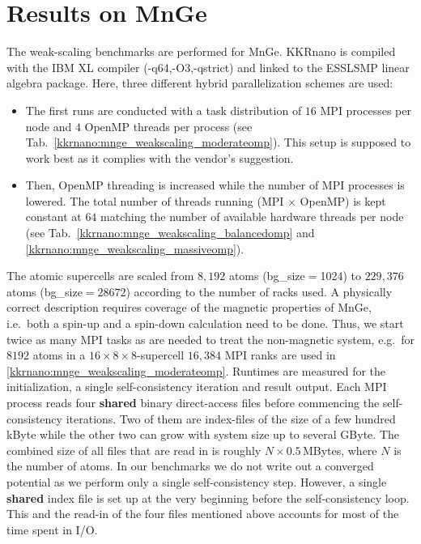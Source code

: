 \section*{Results on MnGe} 
The weak-scaling benchmarks are performed for MnGe. KKRnano is compiled
with the IBM XL compiler (-q64,-O3,-qstrict) and linked to the ESSLSMP linear algebra package.
Here, three different hybrid parallelization schemes are used:
\begin{itemize}
 \item The first runs are conducted with a task distribution of $16$ MPI processes per node 
and $4$ OpenMP threads per process (see Tab.~\ref{kkrnano:mnge_weakscaling_moderateomp}).
This setup is supposed to work best as it complies with the vendor's suggestion.
 \item Then, OpenMP threading is increased while the number of MPI processes is lowered. 
The total number of threads running (MPI $\times$ OpenMP) is kept constant at $64$ matching 
the number of available hardware threads per node 
(see Tab.~\ref{kkrnano:mnge_weakscaling_balancedomp} and \ref{kkrnano:mnge_weakscaling_massiveomp}).
\end{itemize}
The atomic supercells are scaled from $8,192$ atoms (bg\_size$=$1024) to $229,376$ atoms (bg\_size$=28672$)
according to the number of racks used.
A physically correct description requires coverage of the magnetic properties of MnGe, 
i.e.~both a spin-up and a spin-down calculation need to be done. Thus, we start twice as many MPI tasks as 
are needed to treat the non-magnetic system,
e.g.~for $8192$ atoms in a $16 \times 8 \times 8$-supercell $16,384$ MPI ranks are used in \ref{kkrnano:mnge_weakscaling_moderateomp}.
%
Runtimes are measured for the initialization, a single self-consistency iteration and result output.
Each MPI process reads four \textbf{shared} binary direct-access files before commencing the self-consistency iterations. 
Two of them are index-files of the size of a few hundred kByte while the other two can grow with system size up to several GByte.
The combined size of all files that are read in is roughly $N \times 0.5\,$MBytes, where $N$ is the number of atoms.
In our benchmarks we do not write out a converged potential as we perform only a single self-consistency step.
However, a single \textbf{shared} index file is set up at the very beginning before the self-consistency loop. 
This and the read-in of the four files mentioned above accounts for most of the time spent in I/O.
